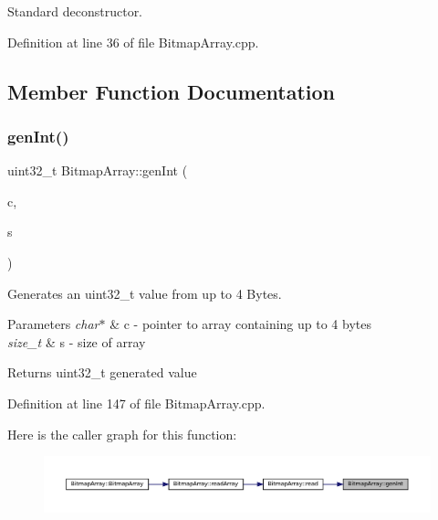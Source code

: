 Standard deconstructor. 

Definition at line 36 of file Bitmap\+Array.\+cpp.



\subsection{Member Function Documentation}
\mbox{\label{classBitmapArray_a158fbbaa026332a732f644a8c368a2f0}} 
\subsubsection{\texorpdfstring{genInt()}{genInt()}}
{\footnotesize\ttfamily uint32\+\_\+t Bitmap\+Array\+::gen\+Int (\begin{DoxyParamCaption}\item[{char $\ast$}]{c,  }\item[{size\+\_\+t}]{s }\end{DoxyParamCaption})\hspace{0.3cm}{\ttfamily [private]}}



Generates an uint32\+\_\+t value from up to 4 Bytes. 


\begin{DoxyParams}{Parameters}
{\em char$\ast$} & c -\/ pointer to array containing up to 4 bytes \\
\hline
{\em size\+\_\+t} & s -\/ size of array \\
\hline
\end{DoxyParams}
\begin{DoxyReturn}{Returns}
uint32\+\_\+t generated value 
\end{DoxyReturn}


Definition at line 147 of file Bitmap\+Array.\+cpp.

Here is the caller graph for this function\+:
\nopagebreak
\begin{figure}[H]
\begin{center}
\leavevmode
\includegraphics[width=350pt]{classBitmapArray_a158fbbaa026332a732f644a8c368a2f0_icgraph}
\end{center}
\end{figure}
\mbox{\label{classBitmapArray_a66bd389c357de601df924569a0b38429}} 
